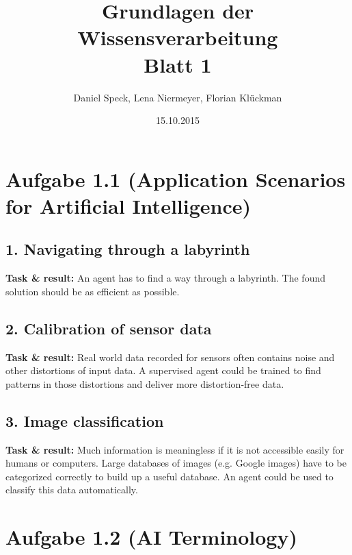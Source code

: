 \documentclass[10pt,a4paper]{article}
\title{\textbf{\huge Grundlagen der Wissensverarbeitung
\\\Large Blatt 1}}
\author{Daniel Speck, Lena Niermeyer, Florian Klückman}
\date{15.10.2015}
\begin{document}
	\maketitle




	\section*{Aufgabe 1.1 (Application Scenarios for Artificial Intelligence)}
	
		\subsection*{1. Navigating through a labyrinth}
		
			\textbf{Task \& result:} An agent has to find a way through a labyrinth. The found solution should be as efficient as possible.
		
		\subsection*{2. Calibration of sensor data}
		
			\textbf{Task \& result:} Real world data recorded for sensors often contains noise and other distortions of input data. A supervised agent could be trained to find patterns in those distortions and deliver more distortion-free data.
		
		\subsection*{3. Image classification}
		
			\textbf{Task \& result:} Much information is meaningless if it is not accessible easily for humans or computers. Large databases of images (e.g. Google images) have to be categorized correctly to build up a useful database. An agent could be used to classify this data automatically.
	
	\section*{Aufgabe 1.2 (AI Terminology)}


		
\end{document}
